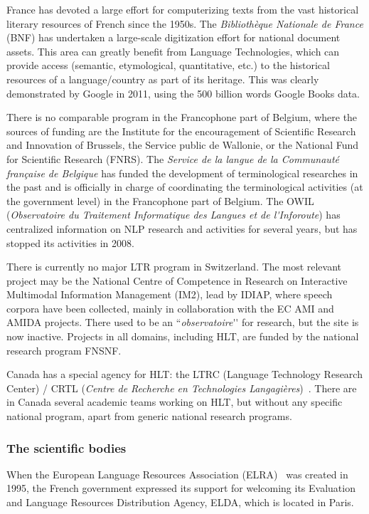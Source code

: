 \documentclass[]{../metanetpaper}
\begin{document}
\begin{multicols}{2}
France has devoted a large effort for computerizing texts from the
vast historical literary resources of French since the 1950s. The
{\em Bibliothèque Nationale de France} (BNF) has undertaken a large-scale
digitization effort for national document assets. This area can
greatly benefit from Language Technologies, which can provide access
(semantic, etymological, quantitative, etc.) to the historical
resources of a language/country as part of its heritage. This was
clearly demonstrated by Google in 2011, using the 500 billion words
Google Books data.

There is no comparable program in the Francophone part of Belgium,
where the sources of funding are the Institute for the encouragement
of Scientific Research and Innovation of Brussels, the Service public
de Wallonie, or the National Fund for Scientific Research (FNRS). The
{\em Service de la langue de la Communauté française de Belgique} has funded
the development of terminological researches in the past and is
officially in charge of coordinating the terminological activities (at
the government level) in the Francophone part of Belgium. The OWIL
({\em Observatoire du Traitement Informatique des Langues et de
l{\mbox '}Inforoute}) has centralized information on NLP research and
activities for several years, but has stopped its activities in 2008.

There is currently no major LTR program in Switzerland. The most
relevant project may be the National Centre of Competence in Research
on Interactive Multimodal Information Management (IM2), lead by IDIAP,
where speech corpora have been collected, mainly in collaboration with
the EC AMI and AMIDA projects. There used to be an ``{\em observatoire}{\mbox '}{\mbox '} for
research, but the site is now inactive. Projects in all domains,
including HLT, are funded by the national research program FNSNF.

Canada has a special agency for HLT: the LTRC (Language Technology
Research Center) / CRTL ({\em Centre de Recherche en Technologies
Langagières})~\cite{canadacrtl}. There are in Canada several academic teams working on
HLT, but without any specific national program, apart from generic
national research programs.

\subsubsection{The scientific bodies}

When the European Language Resources Association (ELRA)~\cite{elra} was created
in 1995, the French government expressed its support for welcoming its
Evaluation and Language Resources Distribution Agency, ELDA, which is
located in Paris.


\end{multicols}
\end{document}
